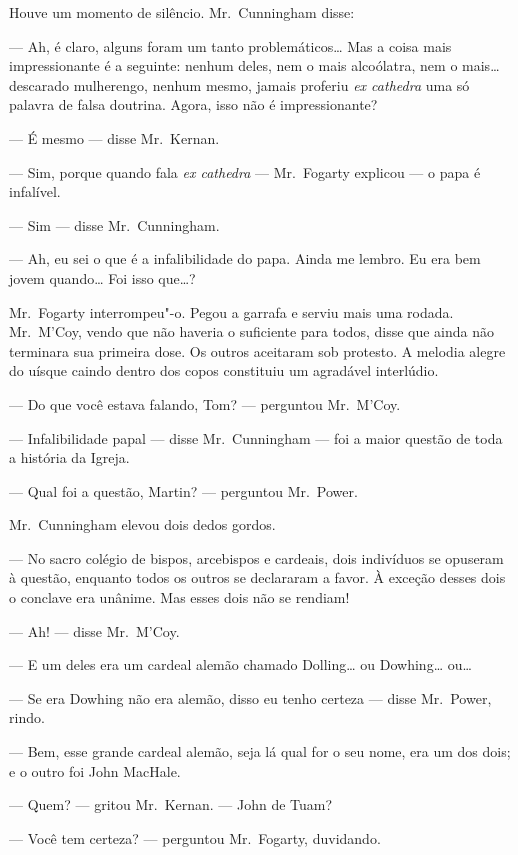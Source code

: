Houve um momento de silêncio.  Mr.~Cunningham disse:

--- Ah, é claro, alguns foram um tanto problemáticos\ldots{} Mas a coisa mais
impressionante é a seguinte: nenhum deles, nem o mais alcoólatra, nem o
mais\ldots{} descarado mulherengo, nenhum mesmo, jamais proferiu \textit{ex
cathedra} uma só palavra de falsa doutrina.  Agora, isso não é impressionante?

--- É mesmo --- disse Mr.~Kernan.

--- Sim, porque quando fala \textit{ex cathedra} --- Mr.~Fogarty explicou ---
o papa é infalível.

--- Sim --- disse Mr.~Cunningham.

--- Ah, eu sei o que é a infalibilidade do papa.  Ainda me lembro.  Eu era bem
jovem quando\ldots{}  Foi isso que\ldots{}?

Mr.~Fogarty interrompeu"-o.  Pegou a garrafa e serviu mais uma rodada.  
Mr.~M’Coy, vendo que não haveria o suficiente para todos, disse que ainda não
terminara sua primeira dose.  Os outros aceitaram sob protesto.  A melodia
alegre do uísque caindo dentro dos copos constituiu um agradável interlúdio.

--- Do que você estava falando, Tom? --- perguntou Mr.~M’Coy.

--- Infalibilidade papal --- disse Mr.~Cunningham --- foi a maior questão de
toda a história da Igreja.

--- Qual foi a questão, Martin? --- perguntou Mr.~Power.

Mr.~Cunningham elevou dois dedos gordos.

--- No sacro colégio de bispos, arcebispos e cardeais, dois indivíduos se
opuseram à questão, enquanto todos os outros se declararam a favor.  À exceção
desses dois o conclave era unânime.  Mas esses dois não se rendiam!

--- Ah! --- disse Mr.~M’Coy.

--- E um deles era um cardeal alemão chamado Dolling\ldots{} ou Dowhing\ldots{}
ou\ldots{}

--- Se era Dowhing não era alemão, disso eu tenho certeza --- disse Mr.~Power,
rindo.

--- Bem, esse grande cardeal alemão, seja lá qual for o seu nome, era um dos
dois; e o outro foi John MacHale.

--- Quem? --- gritou Mr.~Kernan.  --- John de Tuam?

--- Você tem certeza? --- perguntou Mr.~Fogarty, duvidando.

